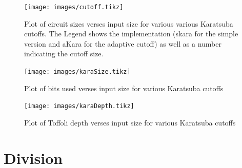      \begin{figure}[p]
        \capstart
        \texttt{[image: images/cutoff.tikz]}
        \caption{Plot of circuit sizes verses input size for various various Karatsuba cutoffs.
                 The Legend shows the implementation (skara for the simple version and aKara for the adaptive cutoff) as well as a number indicating the cutoff size. }
        \label{fig:cutoff}
      \end{figure}

      \begin{figure}[p]
        \capstart
        \texttt{[image: images/karaSize.tikz]}
        \caption{Plot of bits used verses input size for various Karatsuba cutoffs}
        \label{fig:size}
      \end{figure}
      \begin{figure}[p]
        \capstart
        \texttt{[image: images/karaDepth.tikz]}
        \caption{Plot of Toffoli depth verses input size for various Karatsuba cutoffs}
        \label{fig:depth}
      \end{figure}

\section{Division}
